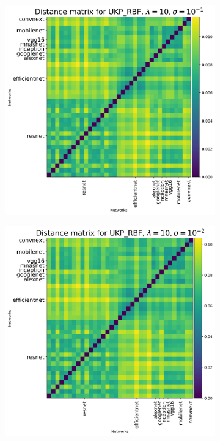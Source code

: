 \documentclass[11pt]{article}
\theoremstyle{plain}
\begin{document}
\begin{figure}[!h]
    \begin{subfigure}[b]{0.3\textwidth}
        \includegraphics[width=\textwidth]{Appendix figures/imagenet_experiments/Heatmaps final/Heatmap for UKP_dist_RBF_1.000000e+01_1.000000e-01.png}
    \end{subfigure}
    \hfill
    \begin{subfigure}[b]{0.3\textwidth}
        \includegraphics[width=\textwidth]{Appendix figures/imagenet_experiments/Heatmaps final/Heatmap for UKP_dist_RBF_1.000000e+01_1.000000e-02.png}

\end{subfigure}
\end{figure}
\end{document}
